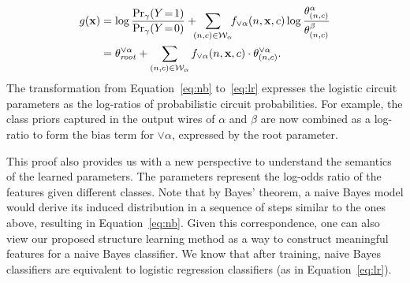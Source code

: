 \documentclass[letterpaper]{article} %
\newcommand{\sample}{{\bf x}}
\begin{document}
\begin{align}
g(\sample)&= \log\frac{\Pr_\gamma(Y\!=\!1)}{\Pr_\gamma(Y\!=\!0)} + \!\!\!\sum_{(n,c) \in \mathcal{W}_{\alpha}} \!\!  f_{\lor \alpha}(n,\sample,c) \log \frac{\theta^\alpha_{(n,c)}}{\theta^\beta_{(n,c)}}  \label{eq:nb}\\
&=\theta^{\lor \alpha}_{\mathit{root}} + \sum_{(n,c) \in \mathcal{W}_{\alpha}}f_{\lor \alpha}(n,\sample,c) \cdot \theta_{(n,c)}^{\lor \alpha}. \label{eq:lr}
\end{align}
The transformation from Equation~\ref{eq:nb} to~\ref{eq:lr} expresses the logistic circuit parameters as the  log-ratios of probabilistic circuit probabilities.
For example, the class priors captured in the output wires of $\alpha$ and $\beta$ are now combined as a log-ratio to form the bias term for $\lor \alpha$, expressed by the root parameter.

This proof also provides us with a new perspective to understand the semantics of the learned parameters.
The parameters represent the log-odds ratio of the features given different classes. Note that by Bayes' theorem, a naive Bayes model would derive its induced distribution in a sequence of steps similar to the ones above, resulting in Equation~\ref{eq:nb}. Given this correspondence, one can also view our proposed structure learning method as a way to construct meaningful features for a naive Bayes classifier. We know that after training, naive Bayes classifiers are equivalent to logistic regression classifiers (as in Equation~\ref{eq:lr}).



\vspace{-0.78mm}
\end{document}
